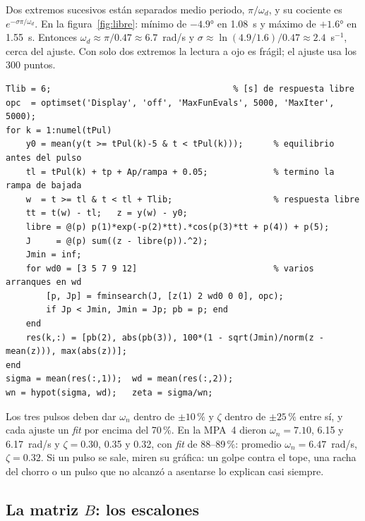 \documentclass[11pt,letterpaper]{article}
\begin{document}
\begin{nota}
Dos extremos sucesivos están separados medio periodo, $\pi/\omega_d$, y su cociente es $e^{-\sigma\pi/\omega_d}$. En la figura~\ref{fig:libre}: mínimo de $-4.9°$ en 1.08~s y máximo de $+1.6°$ en 1.55~s. Entonces $\omega_d\approx\pi/0.47\approx6.7$~rad/s y $\sigma\approx\ln(4.9/1.6)/0.47\approx2.4$~s$^{-1}$, cerca del ajuste. Con solo dos extremos la lectura a ojo es frágil; el ajuste usa los 300 puntos.
\end{nota}

\begin{lstlisting}[caption={Núcleo de \texttt{analisis\_pulsos.m} (extracto; el archivo también grafica y avisa).}]
Tlib = 6;                                    % [s] de respuesta libre
opc  = optimset('Display', 'off', 'MaxFunEvals', 5000, 'MaxIter', 5000);
for k = 1:numel(tPul)
    y0 = mean(y(t >= tPul(k)-5 & t < tPul(k)));      % equilibrio antes del pulso
    tl = tPul(k) + tp + Ap/rampa + 0.05;             % termino la rampa de bajada
    w  = t >= tl & t < tl + Tlib;                    % respuesta libre
    tt = t(w) - tl;   z = y(w) - y0;
    libre = @(p) p(1)*exp(-p(2)*tt).*cos(p(3)*tt + p(4)) + p(5);
    J     = @(p) sum((z - libre(p)).^2);
    Jmin = inf;
    for wd0 = [3 5 7 9 12]                           % varios arranques en wd
        [p, Jp] = fminsearch(J, [z(1) 2 wd0 0 0], opc);
        if Jp < Jmin, Jmin = Jp; pb = p; end
    end
    res(k,:) = [pb(2), abs(pb(3)), 100*(1 - sqrt(Jmin)/norm(z - mean(z))), max(abs(z))];
end
sigma = mean(res(:,1));  wd = mean(res(:,2));
wn = hypot(sigma, wd);   zeta = sigma/wn;
\end{lstlisting}

\begin{nota}
Los tres pulsos deben dar $\omega_n$ dentro de $\pm10\,\%$ y $\zeta$ dentro de $\pm25\,\%$ entre sí, y cada ajuste un \emph{fit} por encima del 70\,\%. En la MPA~4 dieron $\omega_n=7.10$, 6.15 y 6.17~rad/s y $\zeta=0.30$, 0.35 y 0.32, con \emph{fit} de 88--89\,\%: promedio $\omega_n=6.47$~rad/s, $\zeta=0.32$. Si un pulso se sale, miren su gráfica: un golpe contra el tope, una racha del chorro o un pulso que no alcanzó a asentarse lo explican casi siempre.
\end{nota}

\subsection{La matriz \texorpdfstring{$B$}{B}: los escalones}\label{sec:escalones}
\end{document}

